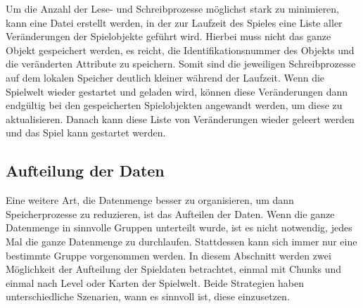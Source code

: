 Um die Anzahl der Lese- und Schreibprozesse möglichst stark zu minimieren, kann eine Datei erstellt werden, in der zur Laufzeit des Spieles eine Liste aller Veränderungen der Spielobjekte geführt wird. Hierbei muss nicht das ganze Objekt gespeichert werden, es reicht, die Identifikationsnummer des Objekts und die veränderten Attribute zu speichern. Somit sind die jeweiligen Schreibprozesse auf dem lokalen Speicher deutlich kleiner während der Laufzeit. Wenn die Spielwelt wieder gestartet und geladen wird, können diese Veränderungen dann endgültig bei den gespeicherten Spielobjekten angewandt werden, um diese zu aktualisieren. Danach kann diese Liste von Veränderungen wieder geleert werden und das Spiel kann gestartet werden.


\subsection{Aufteilung der Daten} 
Eine weitere Art, die Datenmenge besser zu organisieren, um dann Speicherprozesse zu reduzieren, ist das Aufteilen der Daten. Wenn die ganze Datenmenge in sinnvolle Gruppen unterteilt wurde, ist es nicht notwendig, jedes Mal die ganze Datenmenge zu durchlaufen. Stattdessen kann sich immer nur eine bestimmte Gruppe vorgenommen werden. In diesem Abschnitt werden zwei Möglichkeit der Aufteilung der Spieldaten betrachtet, einmal mit Chunks und einmal nach Level oder Karten der Spielwelt. Beide Strategien haben unterschiedliche Szenarien, wann es sinnvoll ist, diese einzusetzen.

